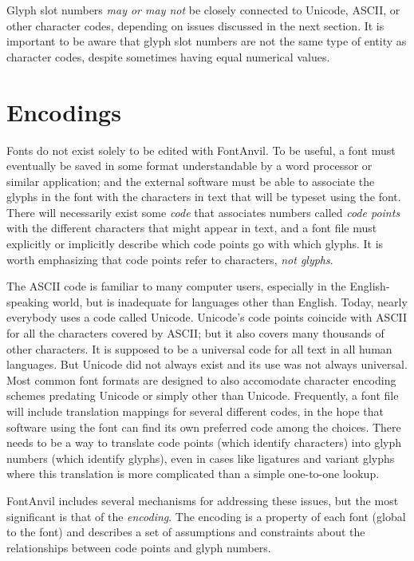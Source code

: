 Glyph slot numbers \emph{may or may not} be closely connected to Unicode,
ASCII, or other character codes, depending on issues discussed in the next
section.  It is important to be aware that glyph slot numbers are not the
same type of entity as character codes, despite sometimes having equal
numerical values.

\section{Encodings}

Fonts do not exist solely to be edited with FontAnvil.  To be useful, a font
must eventually be saved in some format understandable by a word processor
or similar application; and the external software must be able to associate
the glyphs in the font with the characters in text that will be typeset
using the font.  There will necessarily exist some \emph{code} that
associates numbers called \emph{code points} with the different characters
that might appear in text, and a font file must explicitly or implicitly
describe which code points go with which glyphs.  It is worth emphasizing
that code points refer to characters, \emph{not glyphs}.

The ASCII code is familiar to many computer users, especially in the
English-speaking world, but is inadequate for languages other than English. 
Today, nearly everybody uses a code called Unicode.  Unicode's code points
coincide with ASCII for all the characters covered by ASCII; but it also
covers many thousands of other characters.  It is supposed to be a universal
code for all text in all human languages.  But Unicode did not always exist and its use was not always
universal.  Most common font formats are designed to also accomodate
character encoding schemes predating Unicode or simply other than Unicode. 
Frequently, a font file will include translation mappings for several
different codes, in the hope that software using the font can find its own
preferred code among the choices.  There needs to be a way to translate code
points (which identify characters) into glyph numbers (which identify
glyphs), even in cases like ligatures and variant glyphs where this
translation is more complicated than a simple one-to-one lookup.

FontAnvil includes several mechanisms for addressing these issues, but the
most significant is that of the \emph{encoding}.  The encoding is a
property of each font (global to the font) and describes a set of
assumptions and constraints about the relationships between code points and
glyph numbers.


